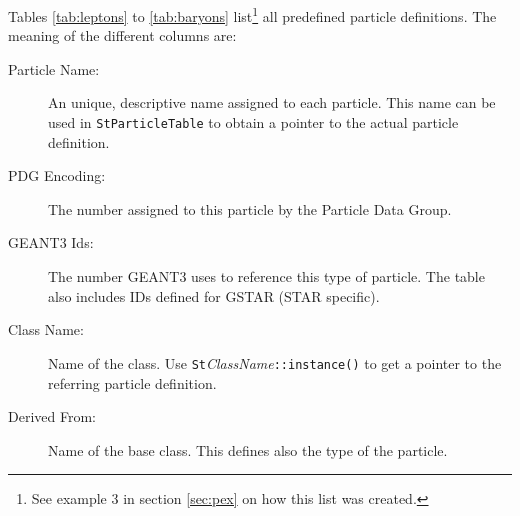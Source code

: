 \documentclass[twoside]{article}
\newcommand{\comp}[1]{\texttt{#1}}%
\newcommand{\args}[1]{\textit{#1}}%
\begin{document}
Tables \ref{tab:leptons} to \ref{tab:baryons} list\footnote{See
    example 3 in section \ref{sec:pex} on how this list was created.}
all predefined particle definitions. The meaning of the different
columns are:
\begin{description}
\item[Particle Name:] An unique, descriptive name assigned to each
    particle.  This name can be used in \comp{StParticleTable} to
    obtain a pointer to the actual particle definition.
\item[PDG Encoding:] The number assigned to this particle by the
    Particle Data Group.
\item[GEANT3 Ids:] The number GEANT3 uses to reference this type of
    particle.  The table also includes IDs defined for GSTAR (STAR
    specific).
\item[Class Name:] Name of the class. Use
    \comp{St}\args{ClassName}\comp{::instance()} to get a pointer to
    the referring particle definition.
\item[Derived From:] Name of the base class. This defines also the
    type of the particle.
\end{description}
\end{document}
